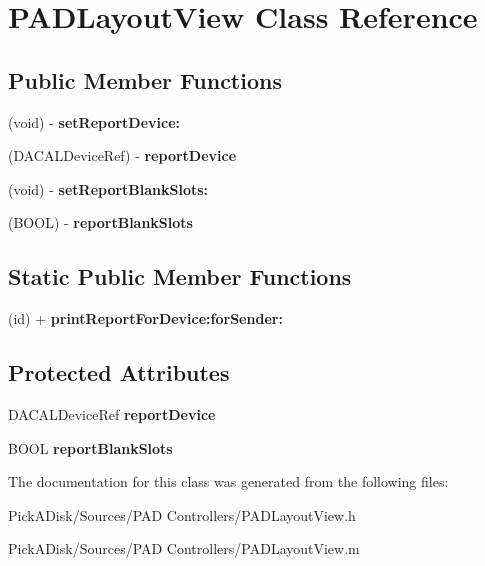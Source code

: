 \hypertarget{interface_p_a_d_layout_view}{
\section{PADLayoutView Class Reference}
\label{interface_p_a_d_layout_view}
}
\subsection*{Public Member Functions}
\begin{DoxyCompactItemize}
\item 
\hypertarget{interface_p_a_d_layout_view_a64d54dddf5259fe3b5dfade9eb6dc0a2}{
(void) -\/ {\bfseries setReportDevice:}}
\label{interface_p_a_d_layout_view_a64d54dddf5259fe3b5dfade9eb6dc0a2}

\item 
\hypertarget{interface_p_a_d_layout_view_abbd91358a228923d48b43fd73a146436}{
(DACALDeviceRef) -\/ {\bfseries reportDevice}}
\label{interface_p_a_d_layout_view_abbd91358a228923d48b43fd73a146436}

\item 
\hypertarget{interface_p_a_d_layout_view_a33e37f86a05cff0e66b63055e21613d0}{
(void) -\/ {\bfseries setReportBlankSlots:}}
\label{interface_p_a_d_layout_view_a33e37f86a05cff0e66b63055e21613d0}

\item 
\hypertarget{interface_p_a_d_layout_view_a008ec61579c5b9886d56e800a0f2b328}{
(BOOL) -\/ {\bfseries reportBlankSlots}}
\label{interface_p_a_d_layout_view_a008ec61579c5b9886d56e800a0f2b328}

\end{DoxyCompactItemize}
\subsection*{Static Public Member Functions}
\begin{DoxyCompactItemize}
\item 
\hypertarget{interface_p_a_d_layout_view_ac961e01c8d30ec108513c1374844e421}{
(id) + {\bfseries printReportForDevice:forSender:}}
\label{interface_p_a_d_layout_view_ac961e01c8d30ec108513c1374844e421}

\end{DoxyCompactItemize}
\subsection*{Protected Attributes}
\begin{DoxyCompactItemize}
\item 
\hypertarget{interface_p_a_d_layout_view_a3fb7b756c2c10d18b52f5911793f9ef4}{
DACALDeviceRef {\bfseries reportDevice}}
\label{interface_p_a_d_layout_view_a3fb7b756c2c10d18b52f5911793f9ef4}

\item 
\hypertarget{interface_p_a_d_layout_view_ac0dd1f78bfdfb8a8bbd7616d691166d3}{
BOOL {\bfseries reportBlankSlots}}
\label{interface_p_a_d_layout_view_ac0dd1f78bfdfb8a8bbd7616d691166d3}

\end{DoxyCompactItemize}


The documentation for this class was generated from the following files:\begin{DoxyCompactItemize}
\item 
PickADisk/Sources/PAD Controllers/PADLayoutView.h\item 
PickADisk/Sources/PAD Controllers/PADLayoutView.m\end{DoxyCompactItemize}
